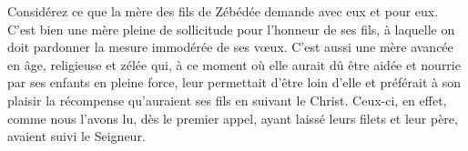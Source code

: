 Considérez ce que la mère des fils de Zébédée demande avec eux et pour eux. C’est bien une mère pleine de sollicitude pour l’honneur de ses fils, à laquelle on doit pardonner la mesure immodérée de ses vœux. C’est aussi une mère avancée en âge, religieuse et zélée qui, à ce moment où elle aurait dû être aidée et nourrie par ses enfants en pleine force, leur permettait d’être loin d’elle et préférait à son plaisir la récompense qu’auraient ses fils en suivant le Christ. Ceux-ci, en effet, comme nous l’avons lu, dès le premier appel, ayant laissé leurs filets et leur père, avaient suivi le Seigneur.
